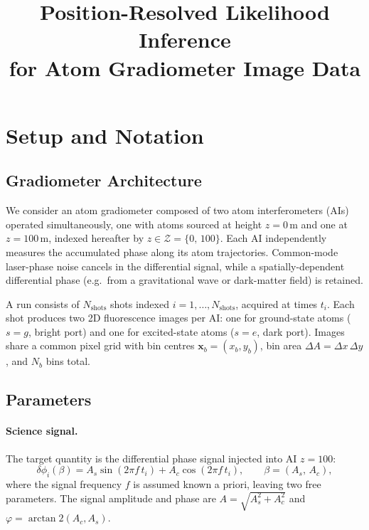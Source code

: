 \documentclass[11pt,a4paper]{article}
\title{%
  Position-Resolved Likelihood Inference\\
  for Atom Gradiometer Image Data%
}
\author{}
\date{}
\newcommand{\x}{\mathbf{x}}
\begin{document}
\maketitle
\tableofcontents
\newpage

\section{Setup and Notation}

\subsection{Gradiometer Architecture}

We consider an atom gradiometer composed of two atom interferometers (AIs)
operated simultaneously, one with atoms sourced at height $z = 0$\,m and one at
$z = 100$\,m, indexed hereafter by $z \in \mathcal{Z} = \{0,\,100\}$.
Each AI independently measures the accumulated phase along its atom trajectories.
Common-mode laser-phase noise cancels in the differential signal, while a
spatially-dependent differential phase (e.g.\ from a gravitational wave or
dark-matter field) is retained.

A run consists of $N_\mathrm{shots}$ shots indexed $i = 1,\ldots,N_\mathrm{shots}$,
acquired at times $t_i$.  Each shot produces two 2D fluorescence images per AI:
one for ground-state atoms ($s = g$, bright port) and one for excited-state atoms
($s = e$, dark port).  Images share a common pixel grid with bin centres
$\x_b = (x_b, y_b)$, bin area $\Delta A = \Delta x\,\Delta y$, and
$N_b$ bins total.

\subsection{Parameters}

\paragraph{Science signal.}
The target quantity is the differential phase signal injected into AI $z=100$:
\begin{equation}
  \delta\phi_i(\beta)
  = A_s \sin(2\pi f\,t_i) + A_c \cos(2\pi f\,t_i),
  \qquad \beta = (A_s,\,A_c),
  \label{eq:signal}
\end{equation}
where the signal frequency $f$ is assumed known a priori, leaving two free
parameters.  The signal amplitude and phase are
$A = \sqrt{A_s^2 + A_c^2}$ and $\varphi = \arctan2(A_c, A_s)$.
\end{document}
